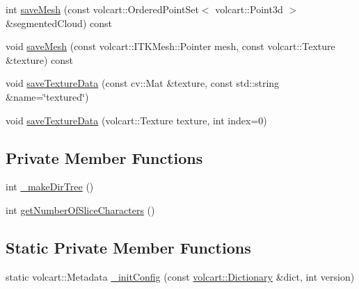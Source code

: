 \begin{DoxyCompactItemize}
\item 
int \hyperlink{classVolumePkg_a8b8474853f26ef0c08cd37ded220c344}{save\+Mesh} (const volcart\+::\+Ordered\+Point\+Set$<$ volcart\+::\+Point3d $>$ \&segmented\+Cloud) const
\item 
void \hyperlink{classVolumePkg_acd9f9d44b478d8d828de4f364983a5f0}{save\+Mesh} (const volcart\+::\+I\+T\+K\+Mesh\+::\+Pointer mesh, const volcart\+::\+Texture \&texture) const
\item 
void \hyperlink{classVolumePkg_ad13a7fb165caa0d3537942907a3e3cad}{save\+Texture\+Data} (const cv\+::\+Mat \&texture, const std\+::string \&name=\char`\"{}textured\char`\"{})
\item 
void \hyperlink{classVolumePkg_a47e37208ab713dbc8d72b5e7f71636f4}{save\+Texture\+Data} (volcart\+::\+Texture texture, int index=0)
\end{DoxyCompactItemize}
\subsection*{Private Member Functions}
\begin{DoxyCompactItemize}
\item 
int \hyperlink{classVolumePkg_ac141a45c12eb8e53def13282b2594ebe}{\+\_\+make\+Dir\+Tree} ()
\item 
int \hyperlink{classVolumePkg_a0c42b917841dd44d5c9de641fadd2a94}{get\+Number\+Of\+Slice\+Characters} ()
\end{DoxyCompactItemize}
\subsection*{Static Private Member Functions}
\begin{DoxyCompactItemize}
\item 
static volcart\+::\+Metadata \hyperlink{classVolumePkg_ab5a10d5694859b8338e100439e2bf118}{\+\_\+init\+Config} (const \hyperlink{namespacevolcart_aa4e334ff80b678b9556aee59618eb37a}{volcart\+::\+Dictionary} \&dict, int version)
\end{DoxyCompactItemize}
